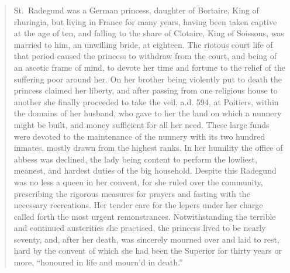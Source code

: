 \documentclass[
  12pt,
  a5paper,
  twoside]{book}
\begin{document}
\begin{quote}
St.~Radegund was a German princess, daughter of Bortaire, King of
rhuringia, but living in France for many years, having been taken
captive at the age of ten, and falling to the share of Clotaire, King of
Soissons, was married to him, an unwilling bride, at eighteen. The
riotous court life of that period caused the princess to withdraw from
the court, and being of an ascetic frame of mind, to devote her time and
fortune to the relief of the suffering poor around her. On her brother
being violently put to death the princess claimed her liberty, and after
passing from one religious house to another she finally proceeded to
take the veil, a.d. 594, at Poitiers, within the domains of her husband,
who gave to her the land on which a nunnery might be built, and money
sufficient for all her need. These large funds were devoted to the
maintenance of the nunnery with its two hundred inmates, mostly drawn
from the highest ranks. In her humility the office of abbess was
declined, the lady being content to perform the lowliest, meanest, and
hardest duties of the big household. Despite this Radegund was no less a
queen in her convent, for she ruled over the community, prescribing the
rigorous measures for prayers and fasting with the necessary
recreations. Her tender care for the lepers under her charge called
forth the most urgent remonstrances. Notwithstanding the terrible and
continued austerities she practised, the princess lived to be nearly
seventy, and, after her death, was sincerely mourned over and laid to
rest, hard by the convent of which she had been the Superior for thirty
years or more, ``honoured in life and mourn'd in death.''
\end{quote}


\backmatter
\end{document}
